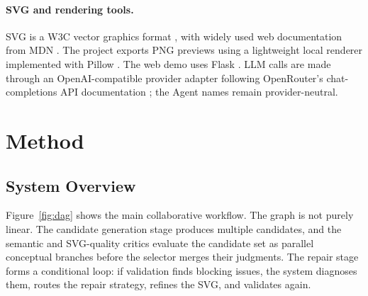 \documentclass[10pt]{article}
\begin{document}
\paragraph{SVG and rendering tools.}
SVG is a W3C vector graphics format \citep{w3csvg2}, with widely used web documentation from MDN \citep{mdnsvg}. The project exports PNG previews using a lightweight local renderer implemented with Pillow \citep{pillowdocs}. The web demo uses Flask \citep{flaskdocs}. LLM calls are made through an OpenAI-compatible provider adapter following OpenRouter's chat-completions API documentation \citep{openrouterdocs}; the Agent names remain provider-neutral.

\section{Method}

\subsection{System Overview}

Figure~\ref{fig:dag} shows the main collaborative workflow. The graph is not purely linear. The candidate generation stage produces multiple candidates, and the semantic and SVG-quality critics evaluate the candidate set as parallel conceptual branches before the selector merges their judgments. The repair stage forms a conditional loop: if validation finds blocking issues, the system diagnoses them, routes the repair strategy, refines the SVG, and validates again.
\end{document}

